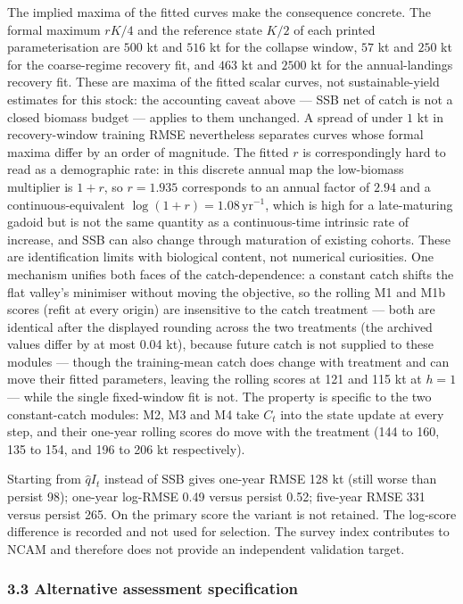 \documentclass[11pt]{article}
\begin{document}
The implied maxima of the fitted curves make the consequence concrete.
The formal maximum \(rK/4\) and the reference state \(K/2\) of each
printed parameterisation are \(500\) kt and \(516\) kt for the collapse
window, \(57\) kt and \(250\) kt for the coarse-regime recovery fit, and
\(463\) kt and \(2500\) kt for the annual-landings recovery fit. These
are maxima of the fitted scalar curves, not sustainable-yield estimates
for this stock: the accounting caveat above --- SSB net of catch is not
a closed biomass budget --- applies to them unchanged. A spread of under
\(1\) kt in recovery-window training RMSE nevertheless separates curves
whose formal maxima differ by an order of magnitude. The fitted \(r\) is
correspondingly hard to read as a demographic rate: in this discrete
annual map the low-biomass multiplier is \(1+r\), so \(r = 1.935\)
corresponds to an annual factor of \(2.94\) and a continuous-equivalent
\(\log(1+r) = 1.08\,\mathrm{yr}^{-1}\), which is high for a
late-maturing gadoid but is not the same quantity as a continuous-time
intrinsic rate of increase, and SSB can also change through maturation
of existing cohorts. These are identification limits with biological
content, not numerical curiosities. One mechanism
unifies both faces of the catch-dependence: a constant catch shifts the
flat valley's minimiser without moving the objective, so the rolling
M1 and M1b scores (refit at every origin) are insensitive to the catch
treatment --- both are identical after the displayed rounding across the two
treatments (the archived values differ by at most 0.04 kt), because
future catch is not supplied to these modules --- though the
training-mean catch does change with treatment and can move their fitted
parameters, leaving the rolling scores at 121 and 115 kt at
\(h=1\) --- while the single
fixed-window fit is not. The property is specific to the two
constant-catch modules: M2, M3 and M4 take \(C_t\) into the state
update at every step, and their one-year rolling scores do move with the
treatment (144 to 160, 135 to 154, and 196 to 206 kt respectively).

Starting from \(\hat q I_t\) instead of SSB gives one-year RMSE 128 kt
(still worse than persist 98); one-year log-RMSE 0.49 versus persist
0.52; five-year RMSE 331 versus persist 265. On the primary score the
variant is not retained. The log-score difference is recorded and not
used for selection. The survey index contributes to NCAM and therefore
does not provide an independent validation target.

\subsubsection{3.3 Alternative assessment
specification}\label{cod-alternative-assessment-specification}
\end{document}
